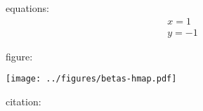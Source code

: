\documentclass{article}
\begin{document}
equations:
\begin{gather}
	x = 1 \\
	y = -1
\end{gather}

figure:

\texttt{[image: ../figures/betas-hmap.pdf]}

citation:
\cite{Cieslak2019}
\end{document}
